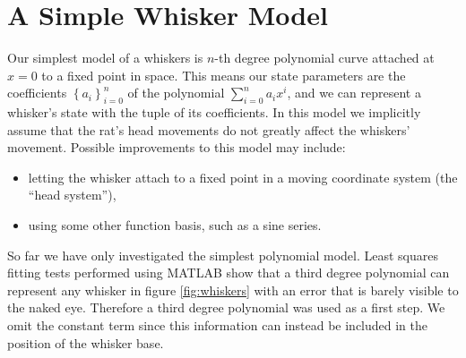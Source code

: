 \section*{A Simple Whisker Model}

Our simplest model of a whiskers is $n$-th degree polynomial curve attached at $x=0$ to a fixed point in space. This means our state parameters are the coefficients $\left\{a_i\right\}_{i=0}^n$ of the polynomial $\sum_{i=0}^n a_ix^i$, and we can represent a whisker's state with the tuple of its coefficients. In this model we implicitly assume that the rat's head movements do not greatly affect the whiskers' movement. Possible improvements to this model may include:

\begin{itemize}
  \item letting the whisker attach to a fixed point in a moving coordinate system (the ``head system''),
  \item using some other function basis, such as a sine series.
\end{itemize}

So far we have only investigated the simplest polynomial model. Least squares fitting tests performed using MATLAB show that a third degree polynomial can represent any whisker in figure \ref{fig:whiskers} with an error that is barely visible to the naked eye. Therefore a third degree polynomial was used as a first step. We omit the constant term since this information can instead be included in the position of the whisker base.


